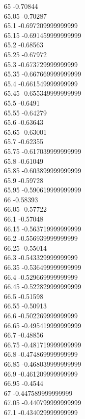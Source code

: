 {65	-0.70844\\
65.05	-0.70287\\
65.1	-0.697209999999999\\
65.15	-0.691459999999999\\
65.2	-0.68563\\
65.25	-0.67972\\
65.3	-0.673729999999999\\
65.35	-0.667669999999999\\
65.4	-0.661549999999999\\
65.45	-0.655349999999999\\
65.5	-0.6491\\
65.55	-0.64279\\
65.6	-0.63643\\
65.65	-0.63001\\
65.7	-0.62355\\
65.75	-0.617039999999999\\
65.8	-0.61049\\
65.85	-0.603899999999999\\
65.9	-0.59728\\
65.95	-0.590619999999999\\
66	-0.58393\\
66.05	-0.57722\\
66.1	-0.57048\\
66.15	-0.563719999999999\\
66.2	-0.556939999999999\\
66.25	-0.55014\\
66.3	-0.543329999999999\\
66.35	-0.536499999999999\\
66.4	-0.529669999999999\\
66.45	-0.522829999999999\\
66.5	-0.51598\\
66.55	-0.50913\\
66.6	-0.502269999999999\\
66.65	-0.495419999999999\\
66.7	-0.48856\\
66.75	-0.481719999999999\\
66.8	-0.474869999999999\\
66.85	-0.468039999999999\\
66.9	-0.461209999999999\\
66.95	-0.4544\\
67	-0.447589999999999\\
67.05	-0.440799999999999\\
67.1	-0.434029999999999\\
}
